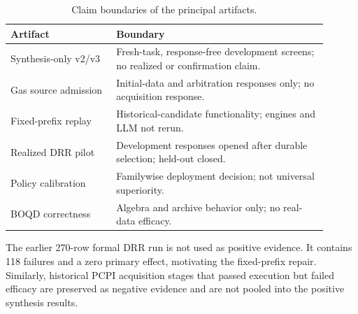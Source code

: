 \documentclass[twoside]{article}
\begin{document}
\begin{table}[h]
\caption{Claim boundaries of the principal artifacts.}
\centering
\small
\begin{tabular}{p{0.30\linewidth}p{0.60\linewidth}}
\toprule
Artifact & Boundary\\
\midrule
Synthesis-only v2/v3 & Fresh-task, response-free development screens; no realized or confirmation claim.\\
Gas source admission & Initial-data and arbitration responses only; no acquisition response.\\
Fixed-prefix replay & Historical-candidate functionality; engines and LLM not rerun.\\
Realized DRR pilot & Development responses opened after durable selection; held-out closed.\\
Policy calibration & Familywise deployment decision; not universal superiority.\\
BOQD correctness & Algebra and archive behavior only; no real-data efficacy.\\
\bottomrule
\end{tabular}
\end{table}

The earlier 270-row formal DRR run is not used as positive evidence. It
contains 118 failures and a zero primary effect, motivating the fixed-prefix
repair. Similarly, historical PCPI acquisition stages that passed execution
but failed efficacy are preserved as negative evidence and are not pooled into
the positive synthesis results.
\end{document}
